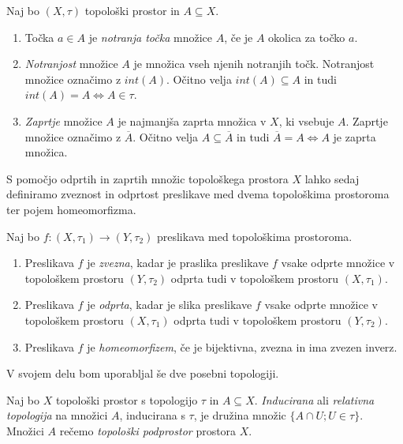 \documentclass[mat1]{fmfdelo}
\newcommand{\closure}[1]{\overline{#1}}
\begin{document}
\begin{definicija}\label{def:notranjost}
Naj bo $(X, \tau)$ topološki prostor in $A \subseteq X$.
\begin{enumerate}
\item Točka $a \in A$ je \emph{notranja točka} množice $A$, če je $A$ okolica za točko $a$.
\item \emph{Notranjost} množice $A$ je množica vseh njenih notranjih točk. Notranjost množice označimo z $int(A)$. Očitno velja $int(A) \subseteq A$ in tudi $int(A) = A \iff A \in \tau$.
\item \emph{Zaprtje} množice $A$ je najmanjša zaprta množica v $X$, ki vsebuje $A$. Zaprtje množice označimo z $\closure{A}$. Očitno velja $A \subseteq \closure{A}$ in tudi $\closure{A} = A \iff A$ je zaprta množica.
\end{enumerate}
\end{definicija}

S pomočjo odprtih in zaprtih množic topološkega prostora $X$ lahko sedaj definiramo zveznost in odprtost preslikave med dvema topološkima prostoroma ter pojem homeomorfizma.

\begin{definicija}\label{def:toppreslikave}
Naj bo $f: (X, \tau_1) \to (Y, \tau_2)$ preslikava med topološkima prostoroma.
\begin{enumerate}
\item Preslikava $f$ je \emph{zvezna}, kadar je praslika preslikave $f$ vsake odprte množice v topološkem prostoru $(Y, \tau_2)$ odprta tudi v topološkem prostoru $(X, \tau_1)$.
\item Preslikava $f$ je \emph{odprta}, kadar je slika preslikave $f$ vsake odprte množice v topološkem prostoru $(X, \tau_1)$ odprta tudi v topološkem prostoru $(Y, \tau_2)$.
\item Preslikava $f$ je \emph{homeomorfizem}, če je bijektivna, zvezna in ima zvezen inverz.
\end{enumerate}
\end{definicija}

V svojem delu bom uporabljal še dve posebni topologiji.

\begin{definicija}
Naj bo $X$ topološki prostor s topologijo $\tau$ in $A \subseteq X$. \emph{Inducirana} ali \emph{relativna topologija} na množici $A$, inducirana s $\tau$, je družina množic $\lbrace A \cap U ; U \in \tau \rbrace$. Množici $A$ rečemo \emph{topološki podprostor} prostora $X$.
\end{definicija}
\end{document}
